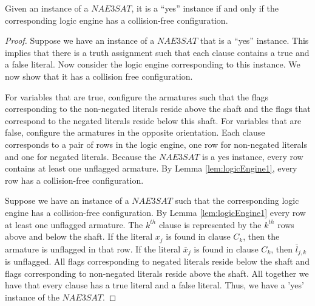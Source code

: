 \begin{thm}\label{thm:Satisfiability-1}
 Given an instance of a $NAE3SAT$,  it is a ``yes'' instance if and only if the corresponding logic 
engine has a collision-free configuration.
\end{thm}
\begin{proof}
Suppose we have an instance of a $NAE3SAT$ that is a ``yes'' instance. This implies that there is a 
truth assignment such that each clause contains a true and a false literal. Now consider the logic 
engine corresponding to this instance. We now 
show that it has a collision free configuration.

For variables that are true, configure the armatures such that the flags corresponding to the 
non-negated literals reside above the 
shaft and the flags that correspond to the negated literals reside below this shaft.  For variables 
that are false, configure the 
armatures in the opposite orientation.  Each clause corresponds to a pair of rows in 
the logic engine, one row for non-negated literals and one for negated literals.  Because the 
$NAE3SAT$ is a yes instance, every row contains at least one unflagged armature.  
By Lemma \ref{lem:logicEngine1}, every row  has a collision-free configuration.

Suppose we have an instance of a $NAE3SAT$ such that the corresponding logic engine has a 
collision-free configuration. By Lemma \ref{lem:logicEngine1} every row at least one unflagged 
armature.  The $k^{th}$ clause is represented by the $k^{th}$ rows above and below the shaft. If the 
literal $x_j$ is found in clause $C_k$, then the armature is unflagged in that row. If the literal 
$\bar{x}_j$ is found in clause $C_k$, then $\bar{l}_{j,k}$ is unflagged.  All flags 
corresponding to negated literals reside below the shaft and flags corresponding to non-negated 
literals reside above the shaft.  All together we have that every clause has a true literal and a 
false literal.  Thus, we have a 'yes' instance of the $NAE3SAT$.
\end{proof}
